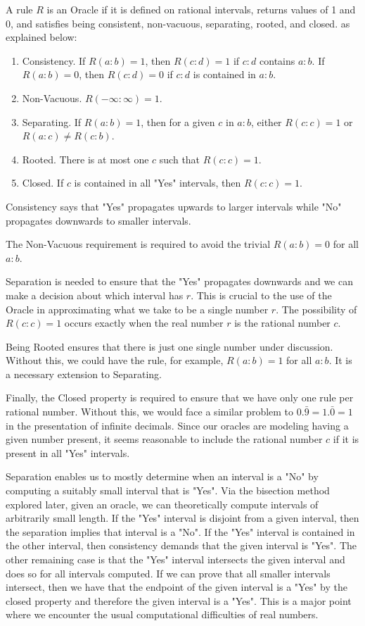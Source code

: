 \documentclass[12pt]{article}
\begin{document}
A rule $R$ is an Oracle if it is defined on rational intervals, returns values of 1
and 0, and satisfies being consistent, non-vacuous, separating, rooted, and closed. 
as explained below: 
\begin{enumerate}
    \item Consistency. If $R(a:b) = 1$, then $R(c:d) = 1$ if $c:d$ contains $a:b$. If $R(a:b)= 0$, then $R(c:d)=0$ if $c:d$ is contained in $a:b$.
    \item Non-Vacuous. $R(-\infty:\infty) = 1$.
    \item Separating. If $R(a:b)=1$, then for a given $c$ in $a:b$, either $R(c:c) = 1$ or $R(a:c) \neq R(c:b)$. 
    \item Rooted. There is at most one $c$ such that $R(c:c) =1$.
    \item Closed. If $c$ is contained in all "Yes" intervals, then $R(c:c) = 1$.
\end{enumerate}

Consistency says that "Yes" propagates upwards to larger intervals while "No" propagates downwards to smaller intervals. 

The Non-Vacuous requirement is required to avoid the trivial $R(a:b) = 0$ for all $a:b$. 

Separation is needed to ensure that the "Yes" propagates downwards and we can make a decision about which interval has $r$. This is crucial to the use of the Oracle in approximating what we take to be a single number $r$. The possibility of $R(c:c) = 1$ occurs exactly when the real number $r$ is the rational number $c$.

Being Rooted ensures that there is just one single number under discussion. Without this, we could have the rule, for example, $R(a:b) = 1$ for all $a:b$. It is a necessary extension to Separating. 

Finally, the Closed property is required to ensure that we have only one rule per rational number. Without this, we would face a similar problem to $0.\bar{9} = 1.\bar{0} = 1$ in the presentation of infinite decimals. Since our oracles are modeling having a given number present, it seems reasonable to include the rational number $c$ if it is present in all "Yes" intervals. 

Separation enables us to mostly determine when an interval is a "No" by computing a suitably small interval that is "Yes". Via the bisection method explored later, given an oracle, we can theoretically compute intervals of arbitrarily small length. If the "Yes" interval is disjoint from a given interval, then the separation implies that interval is a "No". If the "Yes" interval is contained in the other interval, then consistency demands that the given interval is "Yes". The other remaining case is that the "Yes" interval intersects the given interval and does so for all intervals computed. If we can prove that all smaller intervals intersect, then we have that the endpoint of the given interval is a "Yes" by the closed property and therefore the given interval is a "Yes". This is a major point where we encounter the usual computational difficulties of real numbers. 
\end{document}
